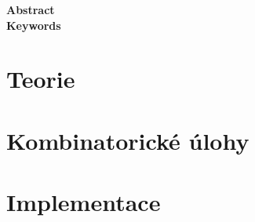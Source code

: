 \documentclass[a4paper,oneside,12pt]{book}
\theoremstyle{definition}
\theoremstyle{plain}
\theoremstyle{remark}
\begin{document}
\newpage
\thispagestyle{empty}
{\Large
\noindent\textbf{Abstract}}\\[3pt]

\vfill
{\Large
\noindent\textbf{Keywords}}\\[3pt]

%

\tableofcontents

\setcounter{page}{1}

\pagebreak


{
  \pagestyle{plain}
  
  
  
  \clearpage
}


\part{Teorie}









\clearpage


\part{Kombinatorické úlohy}







\clearpage


\part{Implementace}





\clearpage




\clearpage




\end{document}
